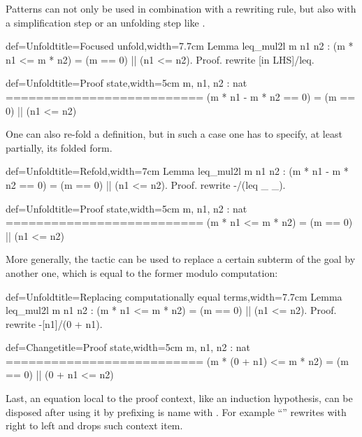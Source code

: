 Patterns can not only be used in combination with a rewriting rule,
but also with a simplification step \C{/=} or an unfolding step
like .

\begin{coq}{def=Unfold}{title=Focused unfold,width=7.7cm}
Lemma leq_mul2l m n1 n2 :
(m * n1 <= m * n2) = (m == 0) || (n1 <= n2).
Proof.
rewrite [in LHS]/leq.
\end{coq}
\begin{coqout}{def=Unfold}{title=Proof state,width=5cm}
m, n1, n2 : nat
==========================
(m * n1 - m * n2 == 0) =
  (m == 0) || (n1 <= n2)
\end{coqout}

One can also re-fold a definition, but in such a case one has to specify,
at least partially, its folded form.

\begin{coq}{def=Unfold}{title=Refold,width=7cm}
Lemma leq_mul2l m n1 n2 :
  (m * n1 - m * n2 == 0) =
    (m == 0) || (n1 <= n2).
Proof.
rewrite -/(leq _ _).
\end{coq}
\begin{coqout}{def=Unfold}{title=Proof state,width=5cm}
m, n1, n2 : nat
==========================
(m * n1 <= m * n2) =
  (m == 0) || (n1 <= n2)
\end{coqout}

More generally, the  tactic can be used to replace a
certain subterm of the goal by another one, which is equal to the
former modulo computation:

\begin{coq}{def=Unfold}{title=Replacing computationally equal terms,width=7.7cm}
Lemma leq_mul2l m n1 n2 :
(m * n1 <= m * n2) = (m == 0) || (n1 <= n2).
Proof.
rewrite -[n1]/(0 + n1).
\end{coq}
\begin{coqout}{def=Change}{title=Proof state,width=5cm}
m, n1, n2 : nat
==========================
(m * (0 + n1) <= m * n2) =
(m == 0) || (0 + n1 <= n2)
\end{coqout}

Last, an equation local to the proof context, like an
induction hypothesis, can be disposed after using it by
prefixing is name with \C{\{\}}.  For example
``'' rewrites with  right to
left and drops such context item.


\label{sec:search}

